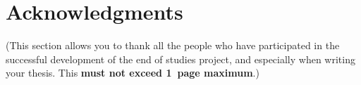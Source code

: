 \chapter*{Acknowledgments}

(This section allows you to thank all the people who have participated in the successful development of the end of studies project, and especially when writing your thesis. This \textbf{must not exceed 1~page maximum}.)